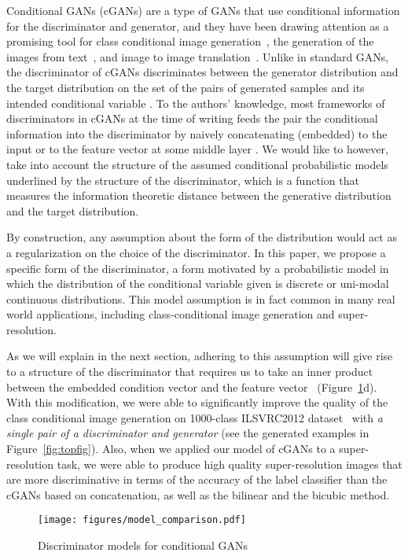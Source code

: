 \documentclass{article}
\begin{document}
Conditional GANs (cGANs) are a type of GANs that use conditional information \cite[]{mirza2014conditional} for the discriminator and generator, and they have been drawing attention as a promising tool for class conditional image generation~\cite[]{odena2016conditional}, the
generation of the images from text~\cite[]{reed2016generative,  zhang2016stackgan}, and image to image translation~\cite[]{kim2017learning, zhu2017unpaired}. 
Unlike in standard GANs, the discriminator of cGANs discriminates between the generator distribution and the target distribution on the set of the pairs of generated samples  and its intended conditional variable
. To the authors' knowledge, most frameworks of
discriminators in cGANs at the time of writing feeds the pair the conditional information  into
the discriminator by naively concatenating (embedded)  to the input or to the feature vector
at some middle layer \cite[]{mirza2014conditional, denton2015deep, reed2016generative, zhang2016stackgan, perarnau2016invertible, saito2016temporal, dumoulin2016adversarially, sricharan2017semi}.  
We would like to however, take into account the structure of the assumed
conditional probabilistic models underlined by the structure of the discriminator, which is a function that measures the information theoretic distance 
between the generative distribution and the target distribution. 

By construction, any assumption about the form of the distribution would act as a regularization on the choice of the discriminator. 
In this paper, we propose a specific form of the discriminator, a form motivated by a probabilistic model in which the distribution of the conditional variable  given  is discrete or uni-modal continuous distributions.
This model assumption is in fact common in many real world applications, including class-conditional image generation and super-resolution.

As we will explain in the next section, adhering to 
this assumption will give rise to a structure of the discriminator that requires us to take an inner product between the embedded condition vector  and the feature vector
~(Figure~\ref{fig:dismodels}d). 
With this modification, we were able to significantly improve the quality of the class conditional image generation on 1000-class ILSVRC2012 dataset~\cite[]{ILSVRC15} with \textit{a single pair of a discriminator and generator} (see the generated examples in Figure~\ref{fig:topfig}). 
Also, when we applied our model of cGANs to a super-resolution task, we were able to produce high quality super-resolution images that are more discriminative in terms of the accuracy of the label classifier than the cGANs based on concatenation,  as well as the bilinear and the bicubic method.
\begin{figure}[t]
	\centering
	\texttt{[image: figures/model\_comparison.pdf]}
    \caption{\label{fig:dismodels} Discriminator models for conditional GANs}
\end{figure}
\end{document}
